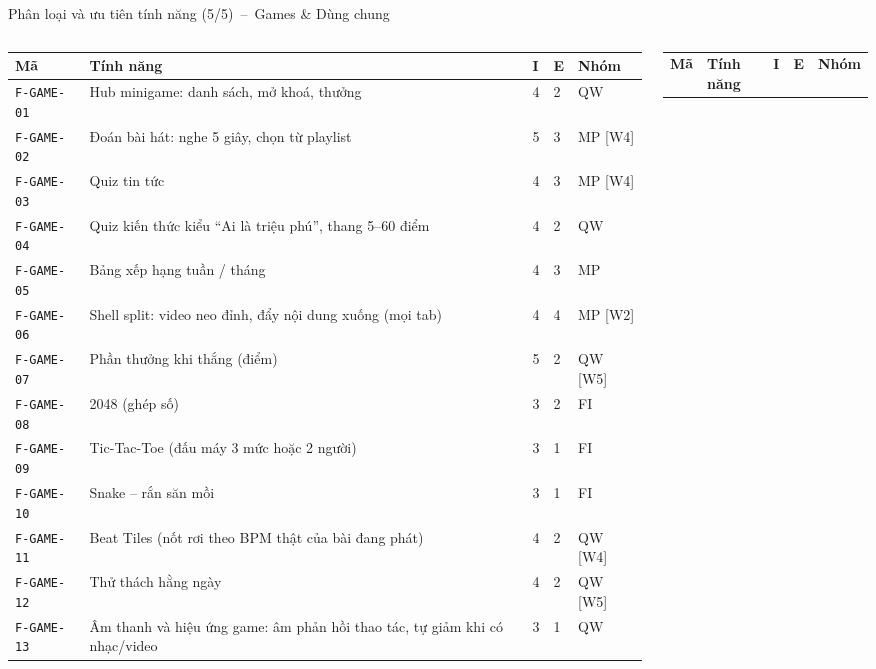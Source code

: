 \documentclass[aspectratio=169]{beamer}
\begin{document}
\begin{frame}{Phân loại và ưu tiên tính năng (5/5)~--~Games \& Dùng chung}
  \begin{columns}
    \begin{column}{0.48\textwidth}\begin{center}\tiny\setlength{\tabcolsep}{1.5pt}
\begin{tabular}{@{}p{1.35cm}p{3.2cm}p{0.22cm}p{0.22cm}p{1.15cm}@{}}
\toprule
\textbf{Mã} & \textbf{Tính năng} & \textbf{I} & \textbf{E} & \textbf{Nhóm} \\
\midrule
\texttt{F-GAME-01} & Hub minigame: danh sách, mở khoá, thưởng & 4 & 2 & QW \\
\texttt{F-GAME-02} & Đoán bài hát: nghe 5 giây, chọn từ playlist & 5 & 3 & MP [W4] \\
\texttt{F-GAME-03} & Quiz tin tức & 4 & 3 & MP [W4] \\
\texttt{F-GAME-04} & Quiz kiến thức kiểu ``Ai là triệu phú'', thang 5--60 điểm & 4 & 2 & QW \\
\texttt{F-GAME-05} & Bảng xếp hạng tuần / tháng & 4 & 3 & MP \\
\texttt{F-GAME-06} & Shell split: video neo đỉnh, đẩy nội dung xuống (mọi tab) & 4 & 4 & MP [W2] \\
\texttt{F-GAME-07} & Phần thưởng khi thắng (điểm) & 5 & 2 & QW [W5] \\
\texttt{F-GAME-08} & 2048 (ghép số) & 3 & 2 & FI \\
\texttt{F-GAME-09} & Tic-Tac-Toe (đấu máy 3 mức hoặc 2 người) & 3 & 1 & FI \\
\texttt{F-GAME-10} & Snake -- rắn săn mồi & 3 & 1 & FI \\
\texttt{F-GAME-11} & Beat Tiles (nốt rơi theo BPM thật của bài đang phát) & 4 & 2 & QW [W4] \\
\texttt{F-GAME-12} & Thử thách hằng ngày & 4 & 2 & QW [W5] \\
\texttt{F-GAME-13} & Âm thanh và hiệu ứng game: âm phản hồi thao tác, tự giảm khi có nhạc/video & 3 & 1 & QW \\
\bottomrule
\end{tabular}
    \end{center}\end{column}
    \begin{column}{0.48\textwidth}\begin{center}\tiny\setlength{\tabcolsep}{1.5pt}
\begin{tabular}{@{}p{1.35cm}p{3.2cm}p{0.22cm}p{0.22cm}p{1.15cm}@{}}
\toprule
\textbf{Mã} & \textbf{Tính năng} & \textbf{I} & \textbf{E} & \textbf{Nhóm} \\

\end{tabular}
\end{center}
\end{column}
\end{columns}
\end{frame}
\end{document}
